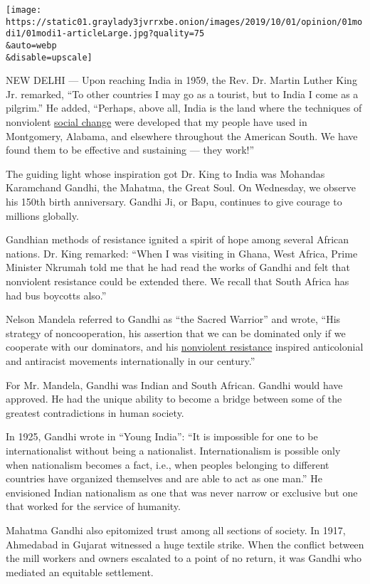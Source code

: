 \texttt{[image: https://static01.graylady3jvrrxbe.onion/images/2019/10/01/opinion/01modi1/01modi1-articleLarge.jpg?quality=75\\\&auto=webp\\\&disable=upscale]}

NEW DELHI --- Upon reaching India in 1959, the Rev. Dr. Martin Luther
King Jr. remarked, ``To other countries I may go as a tourist, but to
India I come as a pilgrim.'' He added, ``Perhaps, above all, India is
the land where the techniques of nonviolent
\href{https://kinginstitute.stanford.edu/king-papers/documents/account-lawrence-dunbar-reddick-press-conference-new-delhi-10-february-1959}{social
change} were developed that my people have used in Montgomery, Alabama,
and elsewhere throughout the American South. We have found them to be
effective and sustaining --- they work!''

The guiding light whose inspiration got Dr. King to India was Mohandas
Karamchand Gandhi, the Mahatma, the Great Soul. On Wednesday, we observe
his 150th birth anniversary. Gandhi Ji, or Bapu, continues to give
courage to millions globally.

Gandhian methods of resistance ignited a spirit of hope among several
African nations. Dr. King remarked: ``When I was visiting in Ghana, West
Africa, Prime Minister Nkrumah told me that he had read the works of
Gandhi and felt that nonviolent resistance could be extended there. We
recall that South Africa has had bus boycotts also.''

Nelson Mandela referred to Gandhi as ``the Sacred Warrior'' and wrote,
``His strategy of noncooperation, his assertion that we can be dominated
only if we cooperate with our dominators, and his
\href{http://content.time.com/time/magazine/article/0,9171,993025,00.html}{nonviolent
resistance} inspired anticolonial and antiracist movements
internationally in our century.''

For Mr. Mandela, Gandhi was Indian and South African. Gandhi would have
approved. He had the unique ability to become a bridge between some of
the greatest contradictions in human society.

In 1925, Gandhi wrote in ``Young India'': ``It is impossible for one to
be internationalist without being a nationalist. Internationalism is
possible only when nationalism becomes a fact, i.e., when peoples
belonging to different countries have organized themselves and are able
to act as one man.'' He envisioned Indian nationalism as one that was
never narrow or exclusive but one that worked for the service of
humanity.

Mahatma Gandhi also epitomized trust among all sections of society. In
1917, Ahmedabad in Gujarat witnessed a huge textile strike. When the
conflict between the mill workers and owners escalated to a point of no
return, it was Gandhi who mediated an equitable settlement.

